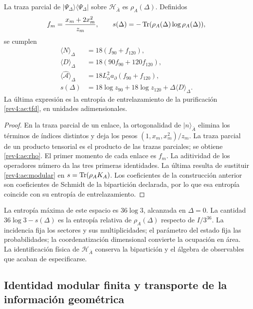 \begin{proposition}
\label{rev4:ae:entropia}
La traza parcial de \(|\Psi_\Delta\rangle\langle\Psi_\Delta|\)
sobre \(\mathscr H_{\bar A}\) es \(\rho_A(\Delta)\). Definidos
\[
 f_m=\frac{x_m+2x_m^2}{z_m},
 \qquad s(\Delta)=-\operatorname{Tr}(\rho_A(\Delta)\log\rho_A(\Delta)),
\]
se cumplen
\begin{align}
 \langle N\rangle_\Delta&=18(f_{90}+f_{120}),\\
 \langle D\rangle_\Delta&=18(90f_{90}+120f_{120}),\\
 \langle\widehat{\mathcal A}\rangle_\Delta
 &=18L_\alpha^2a_\partial(f_{90}+f_{120}),\\
 s(\Delta)&=18\log z_{90}+18\log z_{120}
             +\Delta\langle D\rangle_\Delta.
 \label{rev4:ae:entropia-formula}
\end{align}
La última expresión es la entropía de entrelazamiento de la
purificación \eqref{rev4:ae:tfd}, en unidades adimensionales.
\end{proposition}
\begin{proof}
En la traza parcial de un enlace, la ortogonalidad de
\(|n\rangle_{\bar A}\) elimina los términos de índices distintos y
deja los pesos \((1,x_m,x_m^2)/z_m\). La traza parcial de un producto
tensorial es el producto de las trazas parciales; se obtiene
\eqref{rev4:ae:rho}. El primer momento de cada enlace es \(f_m\).
La aditividad de los operadores número da las tres primeras identidades.
La última resulta de sustituir \eqref{rev4:ae:modular} en
\(s=\operatorname{Tr}(\rho_AK_A)\). Los coeficientes de la construcción anterior
son coeficientes de Schmidt de la bipartición declarada, por lo que
esa entropía coincide con su entropía de entrelazamiento.
\end{proof}

La entropía máxima de este espacio es \(36\log3\), alcanzada en
\(\Delta=0\). La cantidad \(36\log3-s(\Delta)\) es la
entropía relativa de \(\rho_A(\Delta)\) respecto de
\(I/3^{36}\). La incidencia fija los sectores y sus multiplicidades;
el parámetro del estado fija las probabilidades; la coordenatización dimensional
convierte la ocupación en área. La identificación física de
\(\mathscr H_{\bar A}\) conserva la bipartición y el álgebra de
observables que acaban de especificarse.

\subsection{Identidad modular finita y transporte de la información geométrica}

